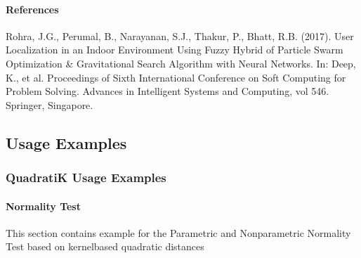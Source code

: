 \documentclass[letterpaper,10pt,english,openany,oneside]{sphinxmanual}
\begin{document}
\paragraph{References}
\label{\detokenize{user_guide/datasets:references}}
\sphinxAtStartPar
Rohra, J.G., Perumal, B., Narayanan, S.J., Thakur, P., Bhatt, R.B. (2017). User Localization in an Indoor Environment Using Fuzzy Hybrid of Particle Swarm Optimization \& Gravitational Search Algorithm with Neural Networks. In: Deep, K., et al. Proceedings of Sixth International Conference on Soft Computing for Problem Solving. Advances in Intelligent Systems and Computing, vol 546. Springer, Singapore. 


\subsection{Usage Examples}
\label{\detokenize{user_guide/index:usage-examples}}
\sphinxstepscope


\subsubsection{QuadratiK Usage Examples}
\label{\detokenize{user_guide/basic_usage:QuadratiK-Usage-Examples}}\label{\detokenize{user_guide/basic_usage::doc}}

\paragraph{Normality Test}
\label{\detokenize{user_guide/basic_usage:Normality-Test}}
\sphinxAtStartPar
This section contains example for the Parametric and Non\sphinxhyphen{}parametric Normality Test based on kernel\sphinxhyphen{}based quadratic distances
\end{document}
